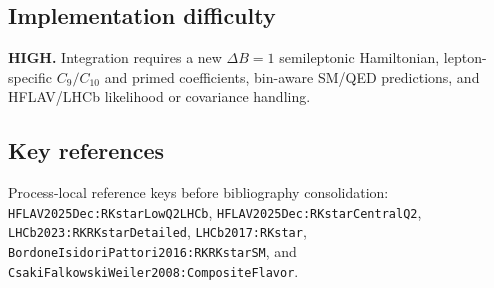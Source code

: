 \subsection*{Implementation difficulty}
\textbf{HIGH.}  Integration requires a new \(\Delta B=1\) semileptonic
Hamiltonian, lepton-specific \(C_9/C_{10}\) and primed coefficients,
bin-aware SM/QED predictions, and HFLAV/LHCb likelihood or covariance handling.

\subsection*{Key references}
Process-local reference keys before bibliography consolidation:
\texttt{HFLAV2025Dec:RKstarLowQ2LHCb},
\texttt{HFLAV2025Dec:RKstarCentralQ2},
\texttt{LHCb2023:RKRKstarDetailed},
\texttt{LHCb2017:RKstar},
\texttt{BordoneIsidoriPattori2016:RKRKstarSM}, and
\texttt{CsakiFalkowskiWeiler2008:CompositeFlavor}.
